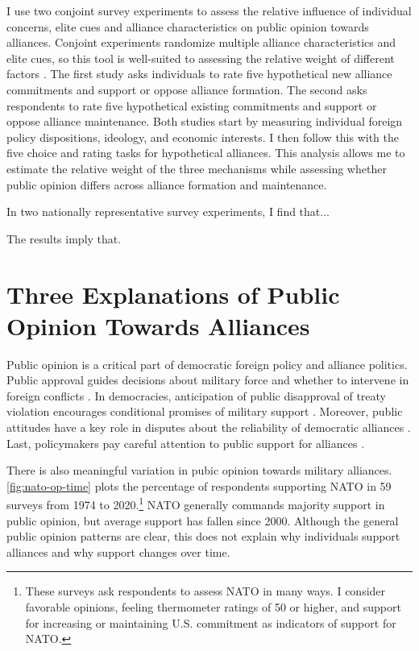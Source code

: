 \documentclass[12pt]{article}
\begin{document}
I use two conjoint survey experiments to assess the relative influence of individual concerns, elite cues and alliance characteristics on public opinion towards alliances. 
Conjoint experiments randomize multiple alliance characteristics and elite cues, so this tool is well-suited to assessing the relative weight of different factors \citep{Hainmuelleretal2014}.
The first study asks individuals to rate five hypothetical new alliance commitments and support or oppose alliance formation.
The second asks respondents to rate five hypothetical existing commitments and support or oppose alliance maintenance. 
Both studies start by measuring individual foreign policy dispositions, ideology, and economic interests. 
I then follow this with the five choice and rating tasks for hypothetical alliances. 
This analysis allows me to estimate the relative weight of the three mechanisms while assessing whether public opinion differs across alliance formation and maintenance.  


In two nationally representative survey experiments, I find that...


The results imply that. 




\section{Three Explanations of Public Opinion Towards Alliances}

Public opinion is a critical part of democratic foreign policy and alliance politics.
Public approval guides decisions about military force and whether to intervene in foreign conflicts \citep{Tomzetal2020, LinGreenberg2021}. 
In democracies, anticipation of public disapproval of treaty violation encourages conditional promises of military support \citep{Chibaetal2015, FjelstulReiter2019}. 
Moreover, public attitudes have a key role in disputes about the reliability of democratic alliances \citep{Gaubatz1996, GartzkeGleditsch2004}. 
Last, policymakers pay careful attention to public support for alliances \citep{Sayle2019}. 


There is also meaningful variation in pubic opinion towards military alliances. 
\autoref{fig:nato-op-time} plots the percentage of respondents supporting NATO in 59 surveys from 1974 to 2020.\footnote{These surveys ask respondents to assess NATO in many ways. I consider favorable opinions, feeling thermometer ratings of 50 or higher, and support for increasing or maintaining U.S. commitment as indicators of support for NATO.} 
NATO generally commands majority support in public opinion, but average support has fallen since 2000. 
Although the general public opinion patterns are clear, this does not explain why individuals support alliances and why support changes over time. 
\end{document}
